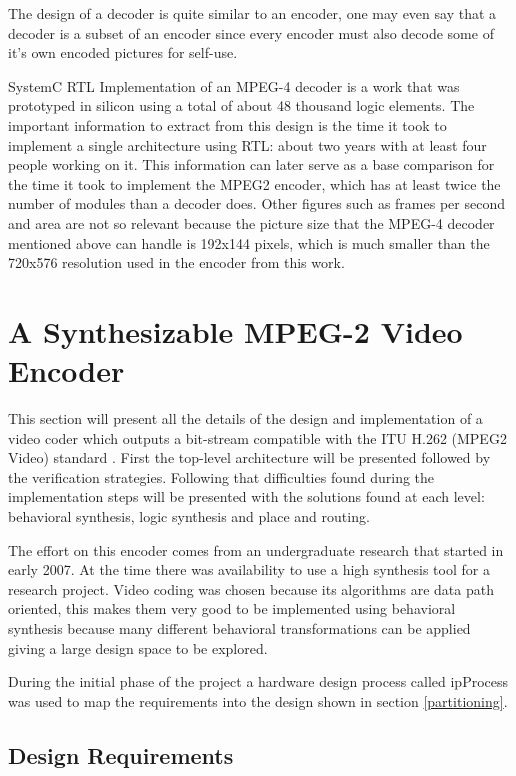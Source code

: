 \documentclass[a4paper, 12pt]{article}
\begin{document}
The design of a decoder is quite similar to an encoder, one may even say that a decoder is a subset of an encoder since every encoder must also decode some of it's own encoded pictures for self-use. 

SystemC RTL Implementation of an MPEG-4 decoder \cite{brazilip} is a work that was prototyped in silicon using a total of about 48 thousand logic elements. The important information to extract from this design is the time it took to implement a single architecture using RTL: about two years with at least four people working on it. This information can later serve as a base comparison for the time it took to implement the MPEG2 encoder, which has at least twice the number of modules than a decoder does. Other figures such as frames per second and area are not so relevant because the picture size that the MPEG-4 decoder mentioned above can handle is 192x144 pixels, which is much smaller than the 720x576 resolution used in the encoder from this work.

\pagebreak

\section{A Synthesizable MPEG-2 Video Encoder}

	This section will present all the details of the design and implementation of a video coder which outputs a bit-stream compatible with the ITU H.262 (MPEG2 Video) standard \cite{mpeg2video}. First the top-level architecture will be presented followed by the verification strategies. Following that difficulties found during the implementation steps will be presented with the solutions found at each level: behavioral synthesis, logic synthesis and place and routing. 

	The effort on this encoder comes from an undergraduate research \cite{viship} that started in early 2007. At the time there was availability to use a high synthesis tool for a research project. Video coding was chosen because its algorithms \cite{chendct} \cite{motion}  are data path oriented, this makes them very good to be implemented using behavioral synthesis because many different behavioral transformations can be applied giving a large design space to be explored.

	During the initial phase of the project a hardware design process called ipProcess \cite{ipprocess} was used to map the requirements into the design shown in section \ref{partitioning}.

\subsection{Design Requirements}
\end{document}
